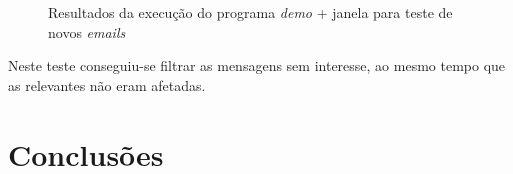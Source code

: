 \documentclass[a4paper,11pt,openright,oneside]{report}
\begin{document}
\begin{figure}[ht]
\center
{}
\caption{Resultados da execução do programa \textit{demo} + janela para teste de novos \textit{emails}}
\label{fig:poc1}
\end{figure}

Neste teste conseguiu-se filtrar as mensagens sem interesse, ao mesmo tempo que as relevantes não eram afetadas.

\chapter{Conclusões}
\label{chap.conclusões}

\maketitle
\nocite{*}

\printbibliography[title={Referências}]
\end{document}
